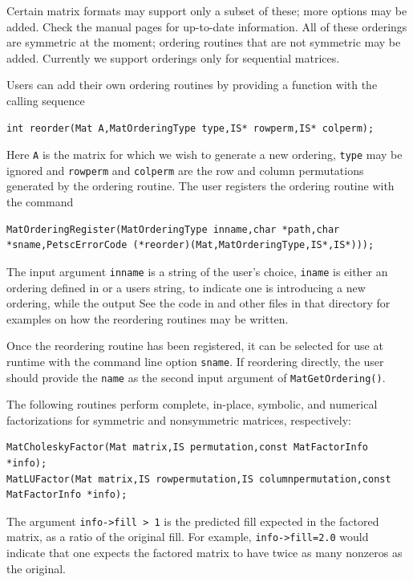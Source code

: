 {{Certain matrix formats may support only a subset of these; more options may
be added. Check the manual pages for up-to-date information. All of these orderings are
symmetric at the moment; ordering routines that are
not symmetric may be added. Currently we support orderings only for
sequential matrices.

Users can add their own ordering routines
by providing a function with the calling sequence
\begin{lstlisting}
int reorder(Mat A,MatOrderingType type,IS* rowperm,IS* colperm);
\end{lstlisting}
Here \lstinline{A} is the matrix for which we wish to generate a new ordering,
\lstinline{type} may be ignored and \lstinline{rowperm} and \lstinline{colperm} are the row
and column permutations generated by the ordering routine.
The user registers the ordering routine
with the command
\begin{lstlisting}
MatOrderingRegister(MatOrderingType inname,char *path,char *sname,PetscErrorCode (*reorder)(Mat,MatOrderingType,IS*,IS*)));
\end{lstlisting}
The  
input argument \lstinline{inname} is a string of the user's choice, \lstinline{iname} is either
an ordering defined in  or a users string,
to indicate one is introducing a new ordering, while the output
See the code in  and other files in that
directory for examples on how the reordering routines may be written.

Once the reordering routine has been registered,
it can be selected for use at runtime with the
command line option  \lstinline{sname}.  If reordering directly,
the user should provide the \lstinline{name} as the second input argument of
\lstinline{MatGetOrdering()}.

The following routines perform complete, in-place, symbolic, and numerical
factorizations for symmetric and nonsymmetric matrices, respectively:
\begin{lstlisting}
MatCholeskyFactor(Mat matrix,IS permutation,const MatFactorInfo *info);
MatLUFactor(Mat matrix,IS rowpermutation,IS columnpermutation,const MatFactorInfo *info);
\end{lstlisting}
The argument \lstinline{info->fill > 1} is the predicted fill
expected in the factored matrix, as a ratio of the original fill.
For example, \lstinline{info->fill=2.0} would indicate that one expects the factored
matrix to have twice as many nonzeros as the original.

}}

